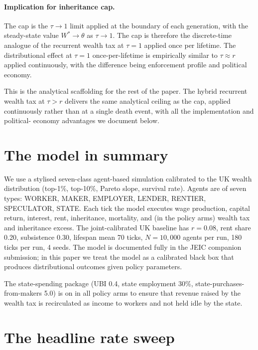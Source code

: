 \documentclass[11pt]{article}
\begin{document}
\paragraph{Implication for inheritance cap.}  The cap is the
$\tau \to 1$ limit applied at the boundary of each generation,
with the steady-state value $W^* \to \theta$ as $\tau \to 1$.  The
cap is therefore the discrete-time analogue of the recurrent
wealth tax at $\tau = 1$ applied once per lifetime.  The
distributional effect at $\tau = 1$ once-per-lifetime is
empirically similar to $\tau \approx r$ applied continuously, with
the difference being enforcement profile and political economy.

This is the analytical scaffolding for the rest of the paper.  The
hybrid recurrent wealth tax at $\tau > r$ delivers the same
analytical ceiling as the cap, applied continuously rather than at
a single death event, with all the implementation and political-
economy advantages we document below.

\section{The model in summary}
\label{sec:model}

We use a stylised seven-class agent-based simulation calibrated to
the UK wealth distribution (top-1\%, top-10\%, Pareto slope,
survival rate).  Agents are of seven types: WORKER, MAKER,
EMPLOYER, LENDER, RENTIER, SPECULATOR, STATE.  Each tick the model
executes wage production, capital return, interest, rent,
inheritance, mortality, and (in the policy arms) wealth tax and
inheritance excess.  The joint-calibrated UK baseline has
$r = 0.08$, rent share 0.20, subsistence 0.30, lifespan
mean 70 ticks, $N = 10{,}000$ agents per run, 180 ticks per run, 4
seeds.  The model is documented fully in the JEIC companion
submission; in this paper we treat the model as a calibrated
black box that produces distributional outcomes given policy
parameters.

The state-spending package (UBI 0.4, state employment 30\%,
state-purchases-from-makers 5.0) is on in all policy arms to
ensure that revenue raised by the wealth tax is recirculated as
income to workers and not held idle by the state.

\section{The headline rate sweep}
\label{sec:sweep}
\end{document}
